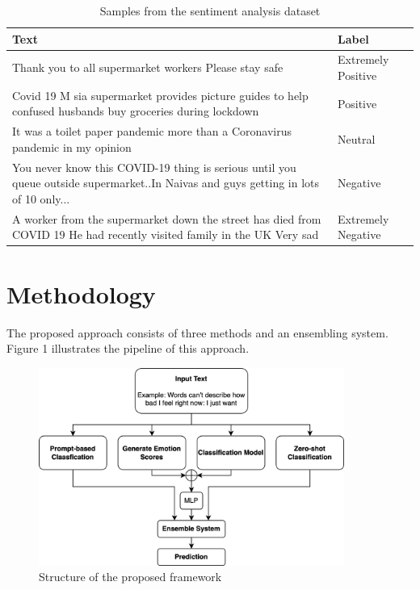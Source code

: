 \documentclass{article}
\begin{document}
\begin{table}
  \caption{Samples from the sentiment analysis dataset}
  \label{table2}
  \centering
  \renewcommand{\arraystretch}{1.5} %
  \begin{tabular}{p{10cm}p{3cm}}
    \toprule
    \textbf{Text} & \textbf{Label} \\
    \midrule
    Thank you to all supermarket workers Please stay safe  & Extremely Positive \\ \hline
    
    Covid 19 M sia supermarket provides picture guides to help confused husbands buy groceries during lockdown & Positive \\ \hline
    
    It was a toilet paper pandemic more than a Coronavirus pandemic in my opinion & Neutral \\ \hline

    You never know this COVID-19 thing is serious until you queue outside supermarket..In Naivas and guys getting in lots of 10 only... & Negative \\ \hline

    A worker from the supermarket down the street has died from COVID 19 He had recently visited family in the UK Very sad & Extremely Negative \\
    \bottomrule
  \end{tabular}
\end{table}

\section{Methodology}

The proposed approach consists of three methods and an ensembling system. Figure 1 illustrates the pipeline of this approach.

\begin{figure}[t]
    \centering
    \includegraphics[width=10cm]{system-structure.png} %
    \caption{Structure of the proposed framework}
\end{figure}
\end{document}
